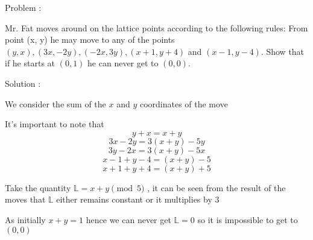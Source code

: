 Problem : 

Mr. Fat moves around on the lattice points according to the following rules: From point (x, y) he may move to any of the points $(y, x), (3x, −2y),
(−2x, 3y), (x + 1, y + 4)$ and $(x − 1, y − 4)$. Show that if he starts at $(0, 1)$ he can never get to $(0, 0)$.


Solution :

We consider the sum of the $x$ and $y$ coordinates of the move 
   
   It's important to note that  \[y+x = x+y\] \[ 3x-2y = 3(x+y)-5y \]
   \[ 3y - 2x = 3(x+y) - 5x\] \[ x-1 + y-4 = (x+y)-5\]\[x+1 + y+4 = (x+y)+5\]
   
Take the quantity $ \mathbb{L} = x+y \pmod{5}$ , it can be seen from the result of the moves that $\mathbb{L}$ either remains constant or it multiplies by $3$

As initially $x+y=1$ hence we can never get $\mathbb{L}=0$ so it is impossible to get to $(0,0)$
